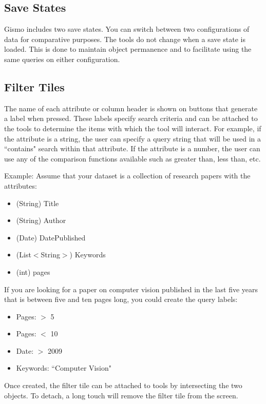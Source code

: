 \documentclass{article}
\begin{document}
\subsection{Save States}
Gismo includes two save states.  You can switch between two configurations of data for comparative purposes.  The tools do not change when a save state is loaded.  This is done to maintain object permanence and to facilitate using the same queries on either configuration.  

\subsection{Filter Tiles}
The name of each attribute or column header is shown on buttons that generate a label when pressed. These labels specify search criteria and can be attached to the tools to determine the items with which the tool will interact. For example, if the attribute is a string, the user can specify a query string that will be used in a ``contains" search within that attribute. If the attribute is a number, the user can use any of the comparison functions available such as greater than, less than, etc. 

Example: Assume that your dataset is a collection of research papers with the attributes: 
\begin{itemize}
\item{(String) Title }
\item{(String) Author }
\item{(Date) DatePublished}
\item{(List$<$String$>$) Keywords}
\item{(int) pages}

\end{itemize}

If you are looking for a paper on computer vision published in the last five years that is between five and ten pages long, you could create the query labels:
\begin{itemize}
\item Pages: $>$ 5
\item Pages: $<$ 10
\item Date: $>$ 2009
\item Keywords: ``Computer Vision"
\end{itemize}

Once created, the filter tile can be attached to tools by intersecting the two objects.  To detach, a long touch will remove the filter tile from the screen.
\end{document}
